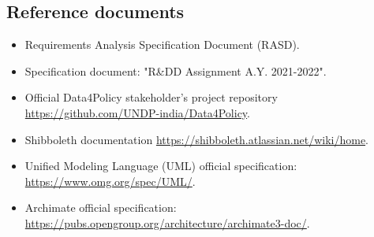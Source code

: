 \subsection{Reference documents}
\begin{itemize}
    \item Requirements Analysis Specification Document (RASD).
    \item Specification document: "R\&DD Assignment A.Y. 2021-2022".
    \item Official Data4Policy stakeholder's project repository \href{https://github.com/UNDP-india/Data4Policy}{https://github.com/UNDP-india/Data4Policy}.
    \item Shibboleth documentation \href{https://shibboleth.atlassian.net/wiki/home}{https://shibboleth.atlassian.net/wiki/home}.
    \item Unified Modeling Language (UML) official specification: \href{https://www.omg.org/spec/UML/}{https://www.omg.org/spec/UML/}.
    \item Archimate official specification:
    \href{https://pubs.opengroup.org/architecture/archimate3-doc/}{https://pubs.opengroup.org/architecture/archimate3-doc/}.
\end{itemize}

